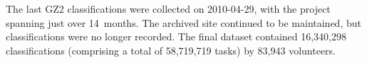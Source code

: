 \documentclass[useAMS,usenatbib]{mn2e}
\begin{document}
The last GZ2 classifications were collected on 2010-04-29, with the project spanning just over 14~months. The archived site continued to be maintained, but classifications were no longer recorded. The final dataset contained 16,340,298 classifications (comprising a total of 58,719,719 tasks) by 83,943 volunteers.

\end{document}
